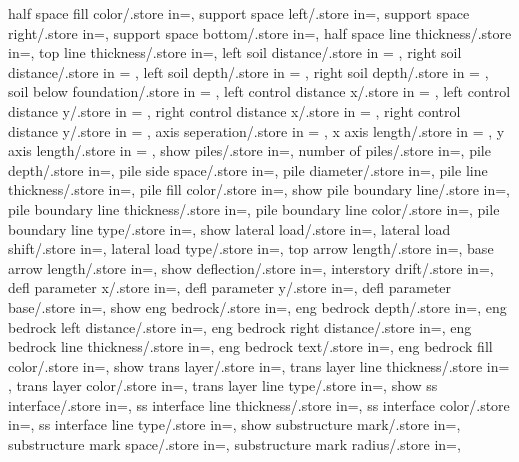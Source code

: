{half space fill color/.store in=\halfspacefillcolor,
support space left/.store in=\hsdistleft,
support space right/.store in=\hsdistright,
support space bottom/.store in=\hsdistbottom,
half space line thickness/.store in=\hsinnerlinethk,
top line thickness/.store in=\thinlinethk,
left soil distance/.store in = \leftsoildist,
right soil distance/.store in = \rightsoildist,
left soil depth/.store in = \leftsoildepth,
right soil depth/.store in = \rightsoildepth,
soil below foundation/.store in = \soilbelowfound,
left control distance x/.store in = \leftcontrolx,
left control distance y/.store in = \leftcontroly,
right control distance x/.store in = \rightcontrolx,
right control distance y/.store in = \rightcontroly,
axis seperation/.store in = \axisseperation,
x axis length/.store in = \axeslenX,
y axis length/.store in = \axeslenY,
show piles/.store in=\showpiles,
number of piles/.store in=\numberofpiles,
pile depth/.store in=\piledepth,
pile side space/.store in=\pilesidespace,
pile diameter/.store in=\pilediameter,
pile line thickness/.store in=\pilelinethickness,
pile fill color/.store in=\pilefillcolor,
show pile boundary line/.store in=\showpbline,
pile boundary line thickness/.store in=\pblinet,
pile boundary line color/.store in=\pblinecolor,
pile boundary line type/.store in=\pblinetype,
show lateral load/.store in=\showlatload,
lateral load shift/.store in=\latloadshift,
lateral load type/.store in=\latloadtype,
top arrow length/.store in=\toparrlen,
base arrow length/.store in=\basearrlen,
show deflection/.store in=\showdefl, 
interstory drift/.store in=\drift,
defl parameter x/.store in=,
defl parameter y/.store in=,
defl parameter base/.store in=,
show eng bedrock/.store in=\showengbedrock,
eng bedrock depth/.store in=\engbedrockdepth,
eng bedrock left distance/.store in=\engbedrockleftdist,
eng bedrock right distance/.store in=\engbedrockrightdist,
eng bedrock line thickness/.store in=\engbedrocklinewidth,
eng bedrock text/.store in=\engbedrocktext,
eng bedrock fill color/.store in=\engbedrockfillcolor,
show trans layer/.store in=\showtranslayer,
trans layer line thickness/.store in= \translayerlinet,
trans layer color/.store in=\translayercolor,
trans layer line type/.store in=\translayerlinetype,
show ss interface/.store in=\showssinter,
ss interface line thickness/.store in=\ssinterlinet,
ss interface color/.store in=\ssintercolor,
ss interface line type/.store in=\ssinterlinetype,
show substructure mark/.store in=\showmarkss,
substructure mark space/.store in=\markssexspace,
substructure mark radius/.store in=\markssrad,
}

